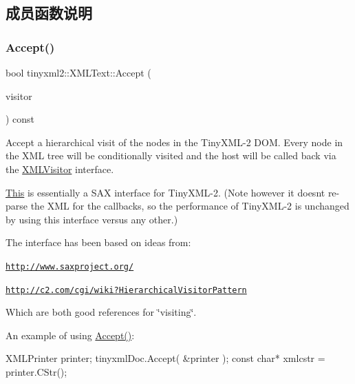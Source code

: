 \subsection{成员函数说明}
\mbox{\label{classtinyxml2_1_1_x_m_l_text_a537c60d7e18fb59c45ac2737a29ac47a}} 
\subsubsection{\texorpdfstring{Accept()}{Accept()}}
{\footnotesize\ttfamily bool tinyxml2\+::\+X\+M\+L\+Text\+::\+Accept (\begin{DoxyParamCaption}\item[{\hyperlink{classtinyxml2_1_1_x_m_l_visitor}{X\+M\+L\+Visitor} $\ast$}]{visitor }\end{DoxyParamCaption}) const\hspace{0.3cm}{\ttfamily [virtual]}}

Accept a hierarchical visit of the nodes in the Tiny\+X\+M\+L-\/2 D\+OM. Every node in the X\+ML tree will be conditionally visited and the host will be called back via the \hyperlink{classtinyxml2_1_1_x_m_l_visitor}{X\+M\+L\+Visitor} interface.

\hyperlink{namespace_this}{This} is essentially a S\+AX interface for Tiny\+X\+M\+L-\/2. (Note however it doesn\textquotesingle{}t re-\/parse the X\+ML for the callbacks, so the performance of Tiny\+X\+M\+L-\/2 is unchanged by using this interface versus any other.)

The interface has been based on ideas from\+:


\begin{DoxyItemize}
\item \href{http://www.saxproject.org/}{\tt http\+://www.\+saxproject.\+org/}
\item \href{http://c2.com/cgi/wiki?HierarchicalVisitorPattern}{\tt http\+://c2.\+com/cgi/wiki?\+Hierarchical\+Visitor\+Pattern}
\end{DoxyItemize}

Which are both good references for \char`\"{}visiting\char`\"{}.

An example of using \hyperlink{classtinyxml2_1_1_x_m_l_text_a537c60d7e18fb59c45ac2737a29ac47a}{Accept()}\+: \begin{DoxyVerb}XMLPrinter printer;
tinyxmlDoc.Accept( &printer );
const char* xmlcstr = printer.CStr();
\end{DoxyVerb}
 

